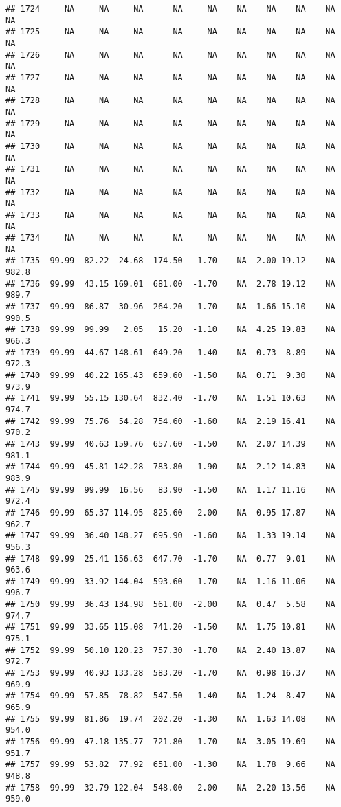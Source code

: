 \documentclass{article}\usepackage{graphicx, color}
\makeatletter
\newenvironment{kframe}{%
 \def\at@end@of@kframe{}%
 \ifinner\ifhmode%
  \def\at@end@of@kframe{\end{minipage}}%
  \begin{minipage}{\columnwidth}%
 \fi\fi%
 \def\FrameCommand##1{\hskip\@totalleftmargin \hskip-\fboxsep
 \colorbox{shadecolor}{##1}\hskip-\fboxsep
     \hskip-\linewidth \hskip-\@totalleftmargin \hskip\columnwidth}%
 \MakeFramed {\advance\hsize-\width
   \@totalleftmargin\z@ \linewidth\hsize
   \@setminipage}}%
 {\par\unskip\endMakeFramed%
 \at@end@of@kframe}
\newenvironment{knitrout}{}{} %
\makeatother
\begin{document}
\begin{knitrout}
\begin{kframe}
\begin{verbatim}
## 1724     NA     NA     NA      NA     NA    NA    NA    NA    NA     NA
## 1725     NA     NA     NA      NA     NA    NA    NA    NA    NA     NA
## 1726     NA     NA     NA      NA     NA    NA    NA    NA    NA     NA
## 1727     NA     NA     NA      NA     NA    NA    NA    NA    NA     NA
## 1728     NA     NA     NA      NA     NA    NA    NA    NA    NA     NA
## 1729     NA     NA     NA      NA     NA    NA    NA    NA    NA     NA
## 1730     NA     NA     NA      NA     NA    NA    NA    NA    NA     NA
## 1731     NA     NA     NA      NA     NA    NA    NA    NA    NA     NA
## 1732     NA     NA     NA      NA     NA    NA    NA    NA    NA     NA
## 1733     NA     NA     NA      NA     NA    NA    NA    NA    NA     NA
## 1734     NA     NA     NA      NA     NA    NA    NA    NA    NA     NA
## 1735  99.99  82.22  24.68  174.50  -1.70    NA  2.00 19.12    NA  982.8
## 1736  99.99  43.15 169.01  681.00  -1.70    NA  2.78 19.12    NA  989.7
## 1737  99.99  86.87  30.96  264.20  -1.70    NA  1.66 15.10    NA  990.5
## 1738  99.99  99.99   2.05   15.20  -1.10    NA  4.25 19.83    NA  966.3
## 1739  99.99  44.67 148.61  649.20  -1.40    NA  0.73  8.89    NA  972.3
## 1740  99.99  40.22 165.43  659.60  -1.50    NA  0.71  9.30    NA  973.9
## 1741  99.99  55.15 130.64  832.40  -1.70    NA  1.51 10.63    NA  974.7
## 1742  99.99  75.76  54.28  754.60  -1.60    NA  2.19 16.41    NA  970.2
## 1743  99.99  40.63 159.76  657.60  -1.50    NA  2.07 14.39    NA  981.1
## 1744  99.99  45.81 142.28  783.80  -1.90    NA  2.12 14.83    NA  983.9
## 1745  99.99  99.99  16.56   83.90  -1.50    NA  1.17 11.16    NA  972.4
## 1746  99.99  65.37 114.95  825.60  -2.00    NA  0.95 17.87    NA  962.7
## 1747  99.99  36.40 148.27  695.90  -1.60    NA  1.33 19.14    NA  956.3
## 1748  99.99  25.41 156.63  647.70  -1.70    NA  0.77  9.01    NA  963.6
## 1749  99.99  33.92 144.04  593.60  -1.70    NA  1.16 11.06    NA  996.7
## 1750  99.99  36.43 134.98  561.00  -2.00    NA  0.47  5.58    NA  974.7
## 1751  99.99  33.65 115.08  741.20  -1.50    NA  1.75 10.81    NA  975.1
## 1752  99.99  50.10 120.23  757.30  -1.70    NA  2.40 13.87    NA  972.7
## 1753  99.99  40.93 133.28  583.20  -1.70    NA  0.98 16.37    NA  969.9
## 1754  99.99  57.85  78.82  547.50  -1.40    NA  1.24  8.47    NA  965.9
## 1755  99.99  81.86  19.74  202.20  -1.30    NA  1.63 14.08    NA  954.0
## 1756  99.99  47.18 135.77  721.80  -1.70    NA  3.05 19.69    NA  951.7
## 1757  99.99  53.82  77.92  651.00  -1.30    NA  1.78  9.66    NA  948.8
## 1758  99.99  32.79 122.04  548.00  -2.00    NA  2.20 13.56    NA  959.0

\end{verbatim}
\end{kframe}
\end{knitrout}
\end{document}
